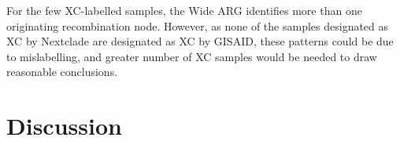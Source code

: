 \documentclass{article}
\begin{document}
For the few XC-labelled samples, the Wide ARG identifies more than one
originating recombination node. However, as none of the samples designated as
XC by Nextclade are designated as XC by GISAID, these patterns could be due to
mislabelling, and greater number of XC samples would be needed to draw reasonable
conclusions.




\section{Discussion}
\end{document}
